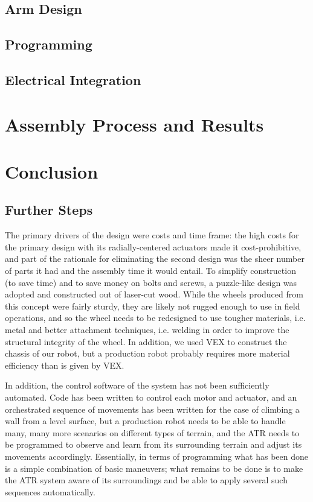 \documentclass[11pt]{article}
\numberwithin{figure}{section}
\begin{document}
\begin{multicols}{2}
\subsection{Arm Design}
\subsection{Programming}
\subsection{Electrical Integration}

\section{Assembly Process and Results}
\section{Conclusion}
\subsection{Further Steps}
The primary drivers of the design were costs and time frame: the high costs for the primary design with its radially-centered actuators made it cost-prohibitive, and part of the rationale for eliminating the second design was the sheer number of parts it had and the assembly time it would entail. To simplify construction (to save time) and to save money on bolts and screws, a puzzle-like design was adopted and constructed out of laser-cut wood. While the wheels produced from this concept were fairly sturdy, they are likely not rugged enough to use in field operations, and so the wheel needs to be redesigned to use tougher materials, i.e. metal and better attachment techniques, i.e. welding in order to improve the structural integrity of the wheel. In addition, we used VEX to construct the chassis of our robot, but a production robot probably requires more material efficiency than is given by VEX.

In addition, the control software of the system has not been sufficiently automated. Code has been written to control each motor and actuator, and an orchestrated sequence of movements has been written for the case of climbing a wall from a level surface, but a production robot needs to be able to handle many, many more scenarios on different types of terrain, and the ATR needs to be programmed to observe and learn from its surrounding terrain and adjust its movements accordingly. Essentially, in terms of programming what has been done is a simple combination of basic maneuvers; what remains to be done is to make the ATR system aware of its surroundings and be able to apply several such sequences automatically.

\end{multicols}
\end{document}
